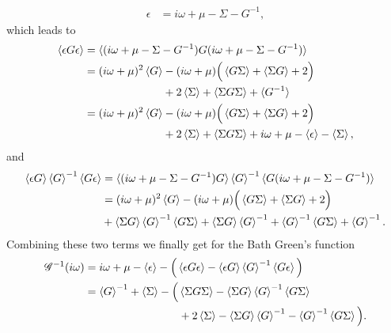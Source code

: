 \documentclass[12pt,a4paper]{scrartcl}
\numberwithin{equation}{section}
\begin{document}
 \begin{align}
  \epsilon &= i\omega+\mu - \Sigma - G^{-1} ,
 \end{align}
which leads to
\begin{align}
\braket{ \epsilon G \epsilon }
 &= \braket{ (i\omega+\mu - \Sigma - G^{-1}) G (i\omega+\mu - \Sigma - G^{-1}) } \\
 &= (i\omega+\mu)^2\braket{G} - (i\omega+\mu)\Big( \braket{G\Sigma} + \braket{\Sigma G} + 2 \Big)  \nonumber \\
   & \hspace{2.5cm} + 2\braket{\Sigma} + \braket{\Sigma G \Sigma} + \braket{G^{-1}} \\
 &= (i\omega+\mu)^2\braket{G} - (i\omega+\mu)\Big( \braket{G\Sigma} + \braket{\Sigma G} + 2 \Big)  \nonumber \\
   & \hspace{2.5cm} + 2\braket{\Sigma} + \braket{\Sigma G \Sigma} + i\omega+\mu - \braket{\epsilon} - \braket{\Sigma} ,
 \end{align}
 and 
\begin{align}
\braket{ \epsilon G }\braket{G}^{-1} \braket{G \epsilon}
 &= \braket{ (i\omega+\mu - \Sigma - G^{-1}) G}\braket{G}^{-1} \braket{G (i\omega+\mu - \Sigma - G^{-1})} \\
 &= (i\omega+\mu)^2\braket{G} - (i\omega+\mu)\Big( \braket{G\Sigma} + \braket{\Sigma G} + 2 \Big)  \nonumber \\
   & \hspace{0.0cm} + \braket{\Sigma G}\braket{G}^{-1}\braket{G\Sigma} 
                    + \braket{\Sigma G} \braket{G}^{-1} + \braket{G}^{-1}\braket{G\Sigma} + \braket{G}^{-1}.
 \end{align}
 Combining these two terms we finally get for the Bath Green's function
\begin{align}
\mathscr{G}^{-1} (i\omega)
 &= i\omega + \mu - \braket{\epsilon} - \Big( \braket{ \epsilon G \epsilon } - \braket{\epsilon G} \braket{G}^{-1}  \braket{ G \epsilon }  \Big)   \\
%
 &= \braket{G}^{-1} + \braket{\Sigma} 
  - \Big( \braket{\Sigma G \Sigma} - \braket{\Sigma G} \braket{G}^{-1} \braket{G\Sigma} \nonumber \\
     & \hspace{3.0cm} + 2\braket{\Sigma} - \braket{\Sigma G} \braket{G}^{-1} - \braket{G}^{-1}\braket{G\Sigma}\Big) .
%
\end{align}
\end{document}
